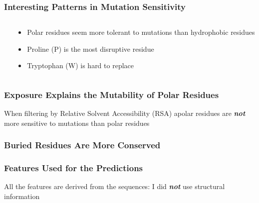 \documentclass[10pt, british, luatex]{beamer}
\begin{document}
\begin{frame}
	\frametitle{Interesting Patterns in Mutation Sensitivity}
	\begin{columns}[c]
		\begin{column}{.5\textwidth}
			\centering%
			\vfill\null%
			{%
				\let\bfseries\sbseries%
				
			}
		\end{column}
		\begin{column}{.5\textwidth}
			\begin{itemize}
				\item Polar residues seem more tolerant to mutations than hydrophobic residues
				\item Proline (P) is the most disruptive residue
				\item Tryptophan (W) is hard to replace
			\end{itemize}
		\end{column}
	\end{columns}
\end{frame}

\begin{frame}
	\frametitle{Exposure Explains the Mutability of Polar Residues}
	When filtering by Relative Solvent Accessibility (RSA) apolar residues are \textbf{\textit{not}} more sensitive to mutations than polar residues
	\vfill%
	\centering%
	{%
		\let\bfseries\sbseries%
		
		
	}
\end{frame}

\begin{frame}
	\frametitle{Buried Residues Are More Conserved}
	\centering%
	{%
		\let\bfseries\sbseries%
		
	}
\end{frame}

\begin{frame}
	\frametitle{Features Used for the Predictions}
	All the features are derived from the sequences: I did \textbf{\textit{not}} use structural information
	\vfill%
	\begin{figure}
		
	\end{figure}
\end{frame}
\end{document}
